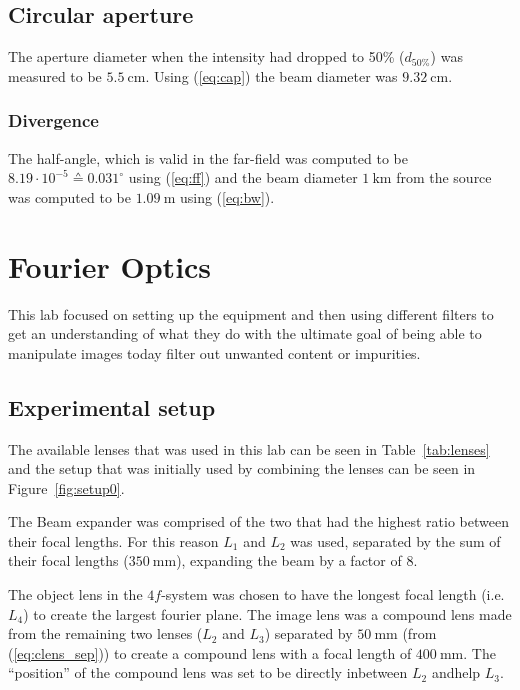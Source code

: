 \documentclass[12pt,a4paper]{article}
\begin{document}
\subsection{Circular aperture}
The aperture diameter when the intensity had dropped to 50\% ($d_{50\%}$) was measured to be $\SI{5.5}{\centi\metre}$. Using (\ref{eq:cap}) the beam diameter was $\SI{9.32}{\centi\metre}$.
\subsubsection{Divergence}
The half-angle, which is valid in the far-field was computed to be $8.19\cdot 10^{-5}\corresponds 0.031^\circ$ using (\ref{eq:ff}) and the beam diameter $\SI{1}{\kilo\metre}$ from the source was computed to be $\SI{1.09}{\metre}$ using (\ref{eq:bw}).

\section{Fourier Optics}
This lab focused on setting up the equipment and then using different filters to get an understanding of what they do with the ultimate goal of being able to manipulate images today filter out unwanted content or impurities.
\subsection{Experimental setup}\label{sec:setup}
The available lenses that was used in this lab can be seen in Table~\ref{tab:lenses} and the setup that was initially used by combining the lenses can be seen in Figure~\ref{fig:setup0}.

The Beam expander was comprised of the two that had the highest ratio between their focal lengths. For this reason $L_1$ and $L_2$ was used, separated by the sum of their focal lengths ($\SI{350}{\milli\metre}$), expanding the beam by a factor of 8.

The object lens in the $4f$-system was chosen to have the longest focal length (i.e. $L_4$) to create the largest fourier plane. The image lens was a compound lens made from the remaining two lenses ($L_2$ and $L_3$) separated by $\SI{50}{\milli\metre}$ (from (\ref{eq:clens_sep})) to create a compound lens with a focal length of $\SI{400}{\milli\metre}$. The ``position'' of the compound lens was set to be directly inbetween $L_2$ andhelp $L_3$.
\end{document}
